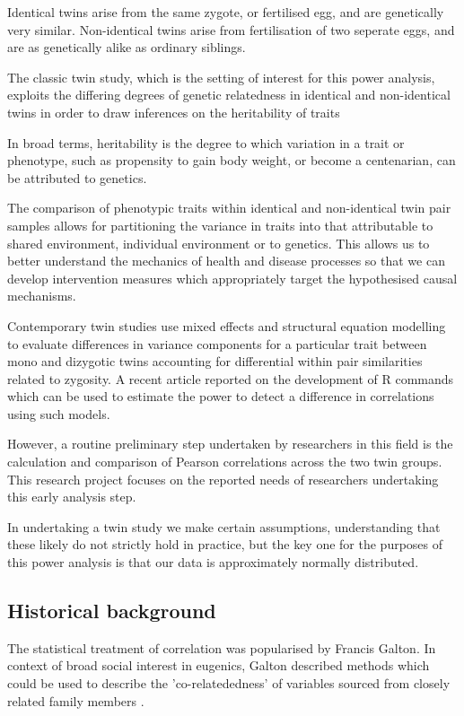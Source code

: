 Identical twins arise from the same zygote, or fertilised egg, and are genetically very similar.  Non-identical twins arise from fertilisation of two seperate eggs, and are as genetically alike as ordinary siblings. 

The classic twin study, which is the setting of interest for this power analysis, exploits the differing degrees of genetic relatedness in identical and non-identical twins in order to draw inferences on the heritability of traits

In broad terms, heritability is the degree to which variation in a trait or phenotype, such as propensity to gain body weight, or become a centenarian, can be attributed to genetics.

The comparison of phenotypic traits within identical and non-identical twin pair samples allows for partitioning the variance in traits into that attributable to  shared environment, individual environment or to genetics.  This allows us to better understand the mechanics of health and disease processes so that we can develop intervention measures which appropriately target the hypothesised causal mechanisms.

Contemporary twin studies use mixed effects and structural equation modelling to evaluate differences in variance components for a particular trait between mono and dizygotic twins accounting for differential within pair similarities related to zygosity.  A recent article reported on the development of R commands which can be used to estimate the power to detect a difference in correlations using such models.  

However, a routine preliminary step undertaken by researchers in this field is the calculation and comparison of Pearson correlations across the two twin groups.  This research project focuses on the reported needs of researchers undertaking this early analysis step.

In undertaking a twin study we make certain assumptions, understanding that these likely do not strictly hold in practice, but the key one for the purposes of this power analysis is that our data is approximately normally distributed.

\subsection{Historical background}
The statistical treatment of correlation was popularised by Francis Galton.  In context of broad social interest in eugenics, Galton described methods which could be used to describe the 'co-relatededness' of variables sourced from closely related family members \cite{Galton1888,Galton1890}.  

